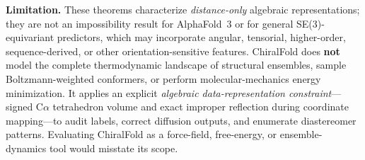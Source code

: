 \noindent\textbf{Limitation.}
These theorems characterize \emph{distance-only} algebraic representations; they are not an
impossibility result for AlphaFold~3 or for general SE(3)-equivariant predictors,
which may incorporate angular, tensorial, higher-order, sequence-derived, or
other orientation-sensitive features.
ChiralFold does \textbf{not} model the complete thermodynamic landscape of structural
ensembles, sample Boltzmann-weighted conformers, or perform molecular-mechanics energy
minimization.
It applies an explicit \emph{algebraic data-representation constraint}---signed
C$\alpha$ tetrahedron volume and exact improper reflection during coordinate
mapping---to audit labels, correct diffusion outputs, and enumerate diastereomer
patterns.
Evaluating ChiralFold as a force-field, free-energy, or ensemble-dynamics tool would
misstate its scope.
